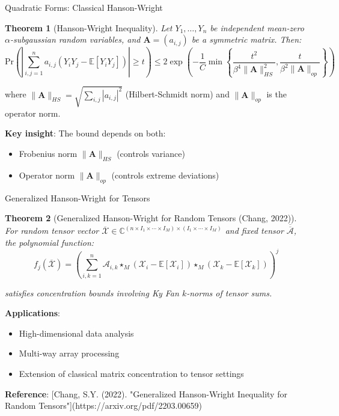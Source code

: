 \documentclass{beamer}
\newtheorem{theorem}{Theorem}[section]
\newcommand{\E}{\mathbb{E}}
\newcommand{\Pr}{\text{Pr}}
\begin{document}
\begin{frame}{Quadratic Forms: Classical Hanson-Wright}
  \begin{theorem}[Hanson-Wright Inequality]
  Let $Y_1, \ldots, Y_n$ be independent mean-zero $\alpha$-subgaussian random variables, and $\mathbf{A} = (a_{i,j})$ be a symmetric matrix. Then:
  $$\Pr\left(\left|\sum_{i,j=1}^n a_{i,j}(Y_i Y_j - \E[Y_i Y_j])\right| \geq t\right) \leq 2\exp\left(-\frac{1}{C}\min\left\{\frac{t^2}{\beta^4\|\mathbf{A}\|_{HS}^2}, \frac{t}{\beta^2\|\mathbf{A}\|_{op}}\right\}\right)$$
  \end{theorem}
  
  where $\|\mathbf{A}\|_{HS} = \sqrt{\sum_{i,j} |a_{i,j}|^2}$ (Hilbert-Schmidt norm) and $\|\mathbf{A}\|_{op}$ is the operator norm.
  
  \textbf{Key insight}: The bound depends on both:
  \begin{itemize}
    \item Frobenius norm $\|\mathbf{A}\|_{HS}$ (controls variance)
    \item Operator norm $\|\mathbf{A}\|_{op}$ (controls extreme deviations)
  \end{itemize}
\end{frame}

\begin{frame}{Generalized Hanson-Wright for Tensors}
  \begin{theorem}[Generalized Hanson-Wright for Random Tensors (Chang, 2022)]
  For random tensor vector $\overline{\mathcal{X}} \in \mathbb{C}^{(n \times I_1 \times \cdots \times I_M) \times (I_1 \times \cdots \times I_M)}$ and fixed tensor $\overline{\overline{\mathcal{A}}}$, the polynomial function:
  $$f_j(\overline{\mathcal{X}}) = \left(\sum_{i,k=1}^n \mathcal{A}_{i,k} \star_M (\mathcal{X}_i - \E[\mathcal{X}_i]) \star_M (\mathcal{X}_k - \E[\mathcal{X}_k])\right)^j$$
  
  satisfies concentration bounds involving Ky Fan $k$-norms of tensor sums.
  \end{theorem}
  
  \textbf{Applications}:
  \begin{itemize}
    \item High-dimensional data analysis
    \item Multi-way array processing
    \item Extension of classical matrix concentration to tensor settings
  \end{itemize}
  
  \textbf{Reference}: [Chang, S.Y. (2022). "Generalized Hanson-Wright Inequality for Random Tensors"](https://arxiv.org/pdf/2203.00659)
\end{frame}
\end{document}
